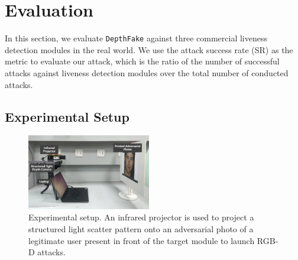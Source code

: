 \section{Evaluation}

In this section, we evaluate \texttt{DepthFake} against three commercial liveness detection modules in the real world. 
We use the attack success rate (SR) as the metric to evaluate our attack, which is the ratio of the number of successful attacks against liveness detection modules over the total number of conducted attacks. 


\subsection{Experimental Setup}
\label{sec:experimental}

\begin{figure}[pt]
	\centerline{\includegraphics[width = 0.48\textwidth]{figures/setup.png}}
	\vspace{-0.1in}
	\caption{Experimental setup. An infrared projector is used to project a structured light scatter pattern onto an adversarial photo of a legitimate user present in front of the target module to launch RGB-D attacks.}
	\vspace{-0.1in}
	\label{setup}
\end{figure}


\begin{table}[pt]
	\small 
	\caption{Default parameters during evaluation.}
	\vspace{-0.2in}
	\begin{center}
		\label{default_param}
	\end{center}
	\vspace{-0.15in}
\end{table}

